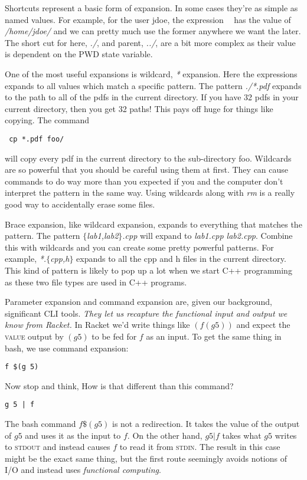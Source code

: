 \documentclass[]{tufte-handout}
\begin{document}
Shortcuts represent a basic form of expansion.  In some cases they're as simple as named values. For example, for the user jdoe, the expression \textbf{~} has the value of \textit{/home/jdoe/} and we can pretty much use the former anywhere we want the later. The short cut for here, \textit{./}, and parent, \textit{../}, are a bit more complex as their value is dependent on the PWD state variable. 

One of the most useful expansions is wildcard, \textit{*} expansion.  Here the expressions expands to all values which match a specific pattern.  The pattern \textit{./*.pdf} expands to the path to all of the pdfs in the current directory.  If you have 32 pdfs in your current directory, then you get 32 paths! This pays off huge for things like copying.  The command \begin{verbatim} cp *.pdf foo/ \end{verbatim} will copy every pdf in the current directory to the sub-directory foo.  Wildcards are so powerful that you should be careful using them at first.  They can cause commands to do way more than you expected if you and the computer don't interpret the pattern in the same way.  Using wildcards along with \textit{rm} is a really good way to accidentally erase some files.  

Brace expansion, like wildcard expansion, expands to everything that matches the pattern. The pattern \textit{$\{$lab1,lab2$\}$.cpp} will expand to \textit{lab1.cpp lab2.cpp}.  Combine this with wildcards and you can create some pretty powerful patterns.  For example, \textit{*.$\{$cpp,h$\}$} expands to all the cpp and h files in the current directory.  This kind of pattern is likely to pop up a lot when we start C++ programming as these two file types are used in C++ programs.


Parameter expansion and command expansion are, given our background, significant CLI tools. \textit{They let us recapture the functional input and output we know from Racket.} In Racket we'd write things like $(f (g 5))$ and expect the \textsc{value} output by $(g 5)$ to be fed for $f$ as an input.  To get the same thing in bash, we use command expansion:
\begin{verbatim}
f $(g 5)
\end{verbatim}
Now stop and think, How is that different than this command?
\begin{verbatim}
g 5 | f
\end{verbatim}

The bash command $f \$(g 5)$ is not a redirection. It takes the value of the output of $g 5$ and uses it as the input to $f$. On the other hand, $g 5 | f$ takes what $g 5$ writes to \textsc{stdout} and instead causes $f$ to read it from \textsc{stdin}.  The result in this case might be the exact same thing, but the first route seemingly avoids notions of \textsc{I/O} and instead uses \textit{functional computing}.   
\end{document}
